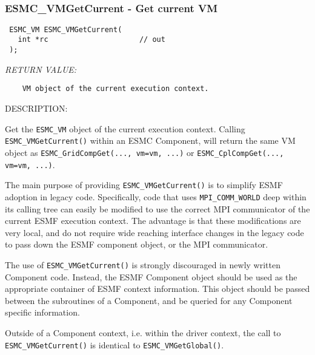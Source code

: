  
\mbox{}\hrulefill\ 
 
\subsubsection [ESMC\_VMGetCurrent] {ESMC\_VMGetCurrent - Get current VM}


  
\begin{verbatim} ESMC_VM ESMC_VMGetCurrent(
   int *rc                     // out
 );\end{verbatim}{\em RETURN VALUE:}
\begin{verbatim}    VM object of the current execution context.\end{verbatim}
{\sf DESCRIPTION:\\ }


  
   \begin{sloppypar}
    Get the {\tt ESMC\_VM} object of the current execution context. Calling
    {\tt ESMC\_VMGetCurrent()} within an ESMC Component, will return the
    same VM object as {\tt ESMC\_GridCompGet(..., vm=vm, ...)} or
    {\tt ESMC\_CplCompGet(..., vm=vm, ...)}. 
   \end{sloppypar}
  
    The main purpose of providing {\tt ESMC\_VMGetCurrent()} is to simplify ESMF
    adoption in legacy code. Specifically, code that uses {\tt MPI\_COMM\_WORLD}
    deep within its calling tree can easily be modified to use the correct MPI
    communicator of the current ESMF execution context. The advantage is that
    these modifications are very local, and do not require wide reaching
    interface changes in the legacy code to pass down the ESMF component object,
    or the MPI communicator.
  
    The use of {\tt ESMC\_VMGetCurrent()} is strongly discouraged in newly
    written Component code. Instead, the ESMF Component object should be used as
    the appropriate container of ESMF context information. This object should be
    passed between the subroutines of a Component, and be queried for any
    Component specific information.
  
    Outside of a Component context, i.e. within the driver context, the call
    to {\tt ESMC\_VMGetCurrent()} is identical to {\tt ESMC\_VMGetGlobal()}.
    \newline
  

